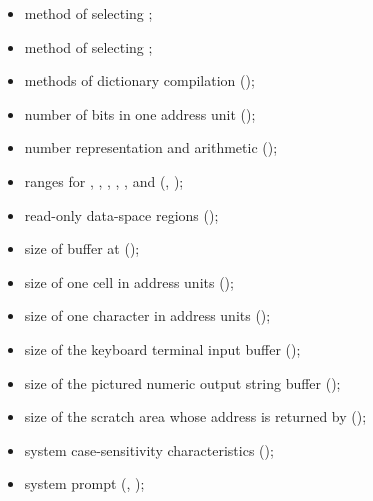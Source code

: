 \begin{itemize}
\item method of selecting ;

\item method of selecting ;

\item methods of dictionary compilation
	();

\item number of bits in one address unit
	();

\item number representation and arithmetic
	();

\item ranges for , , , ,
	, and 
	(,
	 );

\item read-only data-space regions
	();

\item size of buffer at 
	();

\item size of one cell in address units
	();

\item size of one character in address units
	();

\item size of the keyboard terminal input buffer
	();

\item size of the pictured numeric output string buffer
	();

\item size of the scratch area whose address is returned by
	 ();

\item system case-sensitivity characteristics
	();

\item system prompt (,
	);


\end{itemize}
